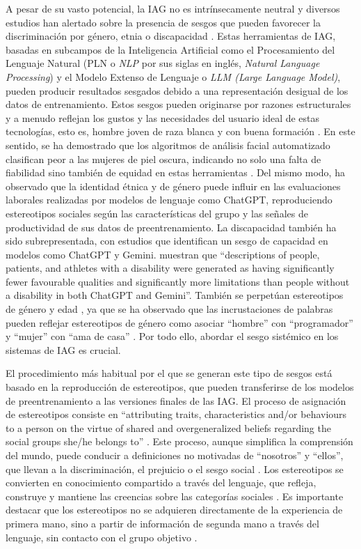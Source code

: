 \documentclass[spanish]{textolivre}
\begin{document}
A pesar de su vasto potencial, la IAG no es intrínsecamente neutral y diversos estudios han alertado sobre la presencia de sesgos que pueden favorecer la discriminación por género, etnia o discapacidad \cite{carneiro2022, whittaker2019}. Estas herramientas de IAG, basadas en subcampos de la Inteligencia Artificial como el Procesamiento del Lenguaje Natural (PLN o \textit{NLP} por sus siglas en inglés, \textit{Natural Language Processing}) y el Modelo Extenso de Lenguaje o \textit{LLM (Large Language Model)}, pueden producir resultados sesgados debido a una representación desigual de los datos de entrenamiento. Estos sesgos pueden originarse por razones estructurales \cite{rosales2019} y a menudo reflejan los gustos y las necesidades del usuario ideal de estas tecnologías, esto es, hombre joven de raza blanca y con buena formación \cite{rosales2021}. En este sentido, se ha demostrado que los algoritmos de análisis facial automatizado clasifican peor a las mujeres de piel oscura, indicando no solo una falta de fiabilidad sino también de equidad en estas herramientas \cite{buolamwini2018}. Del mismo modo, \textcite{lippens2024} ha observado que la identidad étnica y de género puede influir en las evaluaciones laborales realizadas por modelos de lenguaje como ChatGPT, reproduciendo estereotipos sociales según las características del grupo y las señales de productividad de sus datos de preentrenamiento. La discapacidad también ha sido subrepresentada, con estudios que identifican un sesgo de capacidad en modelos como ChatGPT y Gemini. \textcite[p. 1]{urbina2025} muestran que ``descriptions of people, patients, and athletes with a disability were generated as having significantly fewer favourable qualities and significantly more limitations than people without a disability in both ChatGPT and Gemini''. También se perpetúan estereotipos de género y edad \cite{li2025, lippens2024}, ya que se ha observado que las incrustaciones de palabras pueden reflejar estereotipos de género como asociar ``hombre'' con ``programador'' y ``mujer'' con ``ama de casa'' \cite{bolukbasi2016}. Por todo ello, abordar el sesgo sistémico en los sistemas de IAG es crucial.

El procedimiento más habitual por el que se generan este tipo de sesgos está basado en la reproducción de estereotipos, que pueden transferirse de los modelos de preentrenamiento a las versiones finales de las IAG. El proceso de asignación de estereotipos consiste en ``attributing traits, characteristics and/or behaviours to a person on the virtue of shared and overgeneralized beliefs regarding the social groups she/he belongs to'' \cite[p. 651]{lindvallostling2020}. Este proceso, aunque simplifica la comprensión del mundo, puede conducir a definiciones no motivadas de ``nosotros'' y ``ellos'', que llevan a la discriminación, el prejuicio o el sesgo social \cite{bergsieker2012}. Los estereotipos se convierten en conocimiento compartido a través del lenguaje, que refleja, construye y mantiene las creencias sobre las categorías sociales \cite{beukeboom2019}. Es importante destacar que los estereotipos no se adquieren directamente de la experiencia de primera mano, sino a partir de información de segunda mano a través del lenguaje, sin contacto con el grupo objetivo \cite{fiedler2003}.
\end{document}
